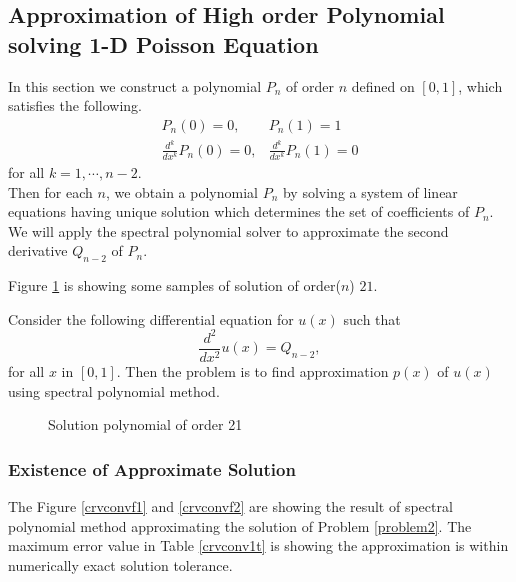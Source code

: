 \subsection {Approximation of High order Polynomial solving
                                                1-D Poisson Equation}

In this section we construct a polynomial $P_n$ of order $n$
defined on $[0,1]$, which satisfies the following.
\begin{eqnarray*}
 P_n(0) = 0, &P_n(1) = 1 \\
 \frac{d^k}{dx^k}P_n(0) = 0, &\frac{d^k}{dx^k}P_n(1) = 0
\end{eqnarray*}
for all $k = 1, \cdots, n-2$. \\
Then for each $n$, we obtain a polynomial $P_n$ by solving a
system of linear equations having unique solution which determines
the set of coefficients of $P_n$. We will apply the spectral
polynomial solver to approximate the second derivative $Q_{n-2}$
of $P_n$.

Figure \ref{sol1} is showing some samples of solution of
order($n$) $21$.

\begin{problem}
\label{problem2}Consider the following differential equation for
$u(x)$ such that
\begin{equation*}
    \frac{d^2}{dx^2} u(x) = Q_{n-2},
\end{equation*}
for all $x$ in $[0, 1]$. Then the problem is to find approximation
$p(x)$ of $u(x)$ using spectral polynomial method.
\end{problem}

\noindent
\begin{figure}
  \centering%
  \caption{\label{sol1}Solution polynomial of order 21}
\end{figure}


\subsubsection{Existence of Approximate Solution}

The Figure \ref{crvconvf1} and \ref{crvconvf2} are showing the
result of spectral polynomial method approximating the solution of
Problem \ref{problem2}. The maximum error value in Table
 \ref{crvconv1t} is showing the approximation is within numerically
exact solution tolerance.

